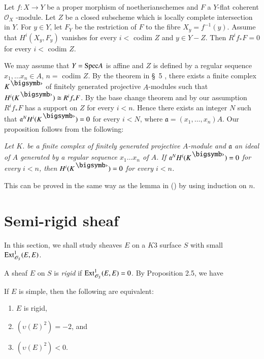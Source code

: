 \begin{Prop}\label{Prop2.26}
Let $f:X\to Y$ be a proper morphism of noetherian\pageoriginale schemes and $F$ a
$Y$-flat coherent $\mathscr{O}_X$ -module. Let $Z$ be a closed
subscheme which is locally complete intersection in $Y$. For $y\in Y$,
let $F_Y$ be the restriction of $F$ to the fibre
$X_y=f^{-1}(y)$. Assume that $H^{i}(X_y,F_y)$ vanishes for every $i<$
codim $Z$ and $y\in Y-Z$. Then $R^{i}f_{\ast}F=0$ for every $i<$ codim
$Z$. 
\end{Prop}

\begin{Proof}
We may assume that $Y=\mathrm{Spec} A$ is affine and $Z$ is defined by a
regular sequence $x_1,\ldots x_n\in A$, $n=$ codim $Z$. By the theorem
in \S\ 5 \cite{key15}, there exists a finite complex $K^{\bigdot}$ of
finitely generated projective $A$-modules such that
$H^{i}(K^{\bigdot})\cong R^{i}f_{\ast}F$. By the base change theorem and
by our assumption $R^{i}f_{\ast}F$ has a support on $Z$ for every
$i<n$. Hence there exists an integer $N$ such that
$\mathfrak{a}^{N}H^{i}(K^{\bigdot})=0$ for every $i<N$, where
$\mathfrak{a}=(x_1,\ldots,x_n)A$. Our proposition follows from the
following: 
\end{Proof}

\begin{lem}
\textit{Let $K$. be a finite complex of finitely generated projective
$A$-module and $\mathfrak{a}$ an ideal of $A$ generated by a regular
sequence $x_1\ldots x_n$ of $A$. If
$\mathfrak{a}^{N}H^{i}(K^{\bigdot})=0$ for every $i<n$, then
$H^{i}(K^{\bigdot})=0$ for every $i<n$.}
\end{lem}

This can be proved in the same way as the lemma in (\cite[p.127]{key15})
by using induction on $n$.
\enprf

\section{Semi-rigid sheaf}\label{s3}

In this section, we shall study sheaves $E$ on a $K3$ surface $S$ with\pageoriginale
small $\mathrm{Ext}^{1}_{\mathscr{O}_S}(E,E)$. 

\begin{dfn}\label{dfn3.1}
A sheaf $E$ on $S$ is \textit{rigid} if
$\mathrm{Ext}^{1}_{\mathscr{O}_S}(E,E)=0$. By Proposition 2.5, we
have 
\end{dfn}

\begin{Prop}\label{Prop3.2}
If $E$ is simple, then the following are equivalent:
\begin{enumerate}
\renewcommand{\labelenumi}{(\theenumi)}
\item $E$ is rigid,
\item $\left(\upsilon(E)^{2}\right)=-2$, and 
\item $\left(\upsilon(E)^{2}\right)<0$.
\end{enumerate}
\end{Prop}

